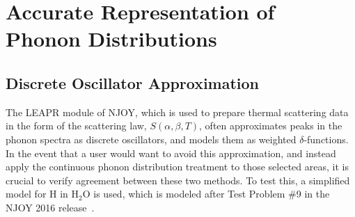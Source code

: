 \documentclass[Master.tex]{subfiles}
\begin{document}
\chapter{Accurate Representation of Phonon Distributions}

\section{Discrete Oscillator Approximation}
  The LEAPR module of NJOY, which is used to prepare thermal scattering data in the form of the scattering law, $S(\alpha,\beta,T)$, often approximates peaks in the phonon spectra as discrete oscillators, and models them as weighted $\delta$-functions. In the event that a user would want to avoid this approximation, and instead apply the continuous phonon distribution treatment to those selected areas, it is crucial to verify agreement between these two methods. To test this, a simplified model for H in H$_2$O is used, which is modeled after Test Problem \#9 in the NJOY 2016 release~\cite{njoy}.
\end{document}
